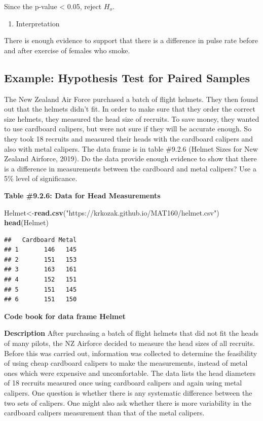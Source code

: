 \documentclass[
]{book}
\newenvironment{Shaded}{\begin{snugshade}}{\end{snugshade}}
\newcommand{\KeywordTok}[1]{\textcolor[rgb]{0.13,0.29,0.53}{\textbf{#1}}}
\newcommand{\NormalTok}[1]{#1}
\newcommand{\StringTok}[1]{\textcolor[rgb]{0.31,0.60,0.02}{#1}}
\providecommand{\tightlist}{%
  \setlength{\itemsep}{0pt}\setlength{\parskip}{0pt}}
\begin{document}
Since the p-value \textless{} 0.05, reject \(H_o\).

\begin{enumerate}
\def\labelenumi{\arabic{enumi}.}
\setcounter{enumi}{5}
\tightlist
\item
  Interpretation
\end{enumerate}

There is enough evidence to support that there is a difference in pulse rate before and after exercise of females who smoke.

\hypertarget{example-hypothesis-test-for-paired-samples-1}{%
\subsection{Example: Hypothesis Test for Paired Samples}\label{example-hypothesis-test-for-paired-samples-1}}

The New Zealand Air Force purchased a batch of flight helmets. They then found out that the helmets didn't fit. In order to make sure that they order the correct size helmets, they measured the head size of recruits. To save money, they wanted to use cardboard calipers, but were not sure if they will be accurate enough. So they took 18 recruits and measured their heads with the cardboard calipers and also with metal calipers. The data frame is in table \#9.2.6 (Helmet Sizes for New Zealand Airforce, 2019). Do the data provide enough evidence to show that there is a difference in measurements between the cardboard and metal calipers? Use a 5\% level of significance.

\textbf{Table \#9.2.6: Data for Head Measurements}

\begin{Shaded}
\begin{Highlighting}[]
\NormalTok{Helmet<-}\KeywordTok{read.csv}\NormalTok{(}\StringTok{"https://krkozak.github.io/MAT160/helmet.csv"}\NormalTok{)}
\KeywordTok{head}\NormalTok{(Helmet)}
\end{Highlighting}
\end{Shaded}

\begin{verbatim}
##   Cardboard Metal
## 1       146   145
## 2       151   153
## 3       163   161
## 4       152   151
## 5       151   145
## 6       151   150
\end{verbatim}

\textbf{Code book for data frame Helmet}

\textbf{Description}
After purchasing a batch of flight helmets that did not fit the heads of many pilots, the NZ Airforce decided to measure the head sizes of all recruits. Before this was carried out, information was collected to determine the feasibility of using cheap cardboard calipers to make the measurements, instead of metal ones which were expensive and uncomfortable. The data lists the head diameters of 18 recruits measured once using cardboard calipers and again using metal calipers. One question is whether there is any systematic difference between the two sets of calipers. One might also ask whether there is more variability in the cardboard calipers measurement than that of the metal calipers.
\end{document}
